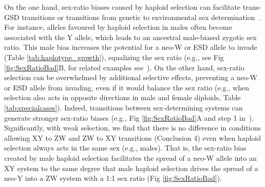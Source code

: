 \documentclass[10pt,letterpaper]{article}
\begin{document}
On the one hand, sex-ratio biases caused by haploid selection can facilitate trans-GSD transitions or transitions from genetic to environmental sex determination~\cite{Kozielska:2010vm}. 
For instance, alleles favoured by haploid selection in males often become associated with the Y allele, which leads to an ancestral male-biased zygotic sex ratio.
This male bias increases the potential for a neo-W or ESD allele to invade (Table \ref{tab:haplotype_growth}), equalizing the sex ratio (e.g., see Fig \ref{fig:SexRatioBad}B, for related examples see~\cite{Kozielska:2010vm}).
On the other hand, sex-ratio selection can be overwhelmed by additional selective effects, preventing a neo-W or ESD allele from invading, even if it would balance the sex ratio (e.g., when selection also acts in opposite directions in male and female diploids, Table \ref{tab:specialcases}).
Indeed, transitions between sex-determining systems can generate stronger sex-ratio biases (e.g., Fig \ref{fig:SexRatioBad}A and step 1 in~\cite{Ubeda:2015fx}).
Significantly, with weak selection, we find that there is no difference in conditions allowing XY to ZW and ZW to XY transitions (Conclusion 4) 
even when haploid selection always acts in the same sex (e.g., males).  
That is, the sex-ratio bias created by male haploid selection facilitates the spread of a neo-W allele into an XY system to the same degree that male haploid selection drives the spread of a neo-Y into a ZW system with a 1:1 sex ratio (Fig \ref{fig:SexRatioBad}).
\end{document}
